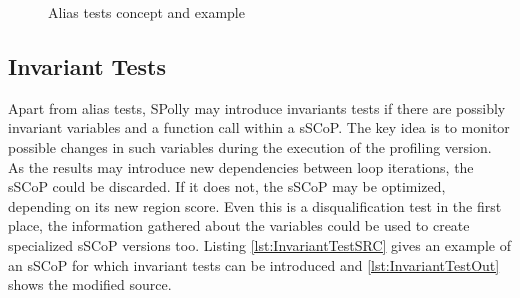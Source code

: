 \lstset{frame=none}
\begin{figure}[htbp]
  \centering

  \vspace*{5mm}
  
  \caption{Alias tests concept and example}
  \label{fig:Aliastest}  
\end{figure}
\resetlst




\subsection{Invariant Tests}
Apart from alias tests, SPolly may introduce invariants tests if there are
possibly invariant variables and a function call within a sSCoP. The key idea
is to monitor possible changes in such variables during the execution of the 
profiling version. As the results may introduce new dependencies 
between loop iterations, the sSCoP could be discarded. If it does not, the sSCoP
may be optimized, depending on its new region score. Even this is a 
disqualification test in the first place, the information gathered about the 
variables could be used to create specialized sSCoP versions too.
Listing \ref{lst:InvariantTestSRC} gives an example of an sSCoP 
for which invariant tests can be introduced and \ref{lst:InvariantTestOut} shows
the modified source. 

